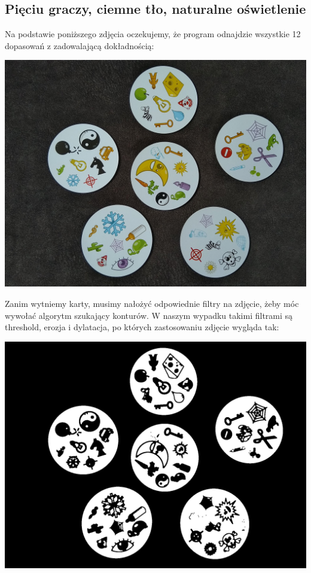 \documentclass[10pt,a4paper]{article}
\begin{document}
\subsection{Pięciu graczy, ciemne tło, naturalne oświetlenie}
Na podstawie poniższego zdjęcia oczekujemy, że program odnajdzie wszystkie 12 dopasowań z zadowalającą dokładnością:\\
\begin{center}
\includegraphics[scale=0.25]{2.1/dobble04.jpg}
\end{center}
Zanim wytniemy karty, musimy nałożyć odpowiednie filtry na zdjęcie, żeby móc wywołać algorytm szukający konturów. W naszym wypadku takimi filtrami są threshold, erozja i dylatacja, po których zastosowaniu zdjęcie wygląda tak:\\
\begin{center}
\includegraphics[scale=0.20]{2.1/th1.jpg}
\end{center}
\end{document}
